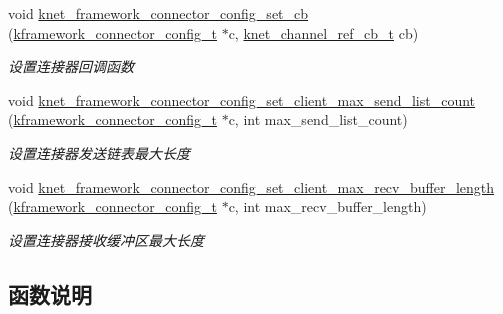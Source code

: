 \begin{DoxyCompactItemize}
void \hyperlink{a00115_ga03024112cca453db282a4aa4af7bedc8_ga03024112cca453db282a4aa4af7bedc8}{knet\+\_\+framework\+\_\+connector\+\_\+config\+\_\+set\+\_\+cb} (\hyperlink{a00056_a44d3033eba5a4fd784a741700a7a2521_a44d3033eba5a4fd784a741700a7a2521}{kframework\+\_\+connector\+\_\+config\+\_\+t} $\ast$c, \hyperlink{a00056_a8a7d96123ef4565c6d08fe58a10476a9_a8a7d96123ef4565c6d08fe58a10476a9}{knet\+\_\+channel\+\_\+ref\+\_\+cb\+\_\+t} cb)
\begin{DoxyCompactList}\small\item\em 设置连接器回调函数 \end{DoxyCompactList}\item 
void \hyperlink{a00115_ga32b058fe0a17d4a609097157761bb9f1_ga32b058fe0a17d4a609097157761bb9f1}{knet\+\_\+framework\+\_\+connector\+\_\+config\+\_\+set\+\_\+client\+\_\+max\+\_\+send\+\_\+list\+\_\+count} (\hyperlink{a00056_a44d3033eba5a4fd784a741700a7a2521_a44d3033eba5a4fd784a741700a7a2521}{kframework\+\_\+connector\+\_\+config\+\_\+t} $\ast$c, int max\+\_\+send\+\_\+list\+\_\+count)
\begin{DoxyCompactList}\small\item\em 设置连接器发送链表最大长度 \end{DoxyCompactList}\item 
void \hyperlink{a00115_ga671b44cb682198b418b21749e6b2fdbe_ga671b44cb682198b418b21749e6b2fdbe}{knet\+\_\+framework\+\_\+connector\+\_\+config\+\_\+set\+\_\+client\+\_\+max\+\_\+recv\+\_\+buffer\+\_\+length} (\hyperlink{a00056_a44d3033eba5a4fd784a741700a7a2521_a44d3033eba5a4fd784a741700a7a2521}{kframework\+\_\+connector\+\_\+config\+\_\+t} $\ast$c, int max\+\_\+recv\+\_\+buffer\+\_\+length)
\begin{DoxyCompactList}\small\item\em 设置连接器接收缓冲区最大长度 \end{DoxyCompactList}\end{DoxyCompactItemize}


\subsection{函数说明}
\hypertarget{a00115_gab236e9cd130017f98625904439052b30_gab236e9cd130017f98625904439052b30}{}
